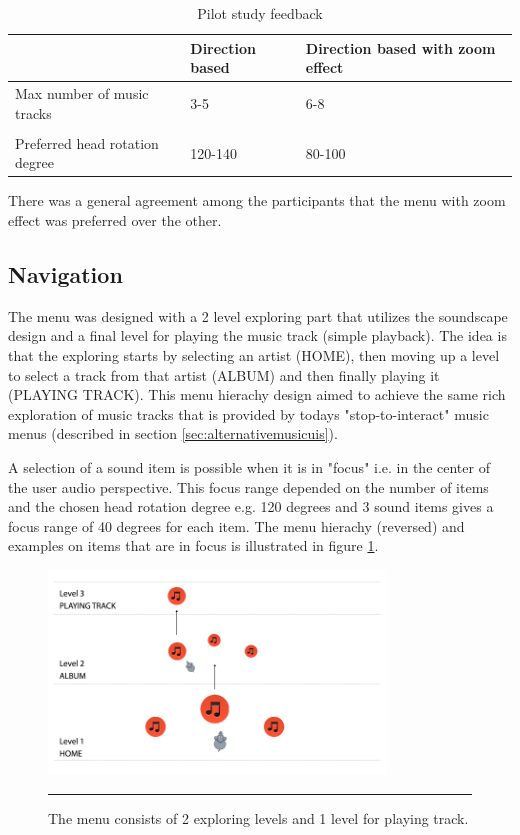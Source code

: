\begin{table}[t] 
\scriptsize
\centering
\caption{Pilot study feedback} %
\begin{tabular}{L{3cm}C{3cm}C{3cm}} \toprule
	 & Direction based & Direction based with zoom effect \\ \midrule
    Max number of music tracks   & 3-5 & 6-8 \\
    \\
    Preferred head rotation degree   & 120-140 & 80-100 \\ \bottomrule
\end{tabular}

\label{tab:pilotresults} 
\end{table}

There was a general agreement among the participants that the menu with zoom effect was preferred over the other.

\subsection{Navigation}
\label{sec:designnavigation}
The menu was designed with a 2 level exploring part that utilizes the soundscape design and a final level for playing the music track (simple playback). The idea is that the exploring starts by selecting an artist (HOME), then moving up a level to select a track from that artist (ALBUM) and then finally playing it (PLAYING TRACK). This menu hierachy design aimed to achieve the same rich exploration of music tracks that is provided by todays "stop-to-interact" music menus (described in section \ref{sec:alternativemusicuis}). 

A selection of a sound item is possible when it is in "focus" i.e. in the center of the user audio perspective. This focus range depended on the number of items and the chosen head rotation degree e.g. 120 degrees and 3 sound items gives a focus range of 40 degrees for each item. The menu hierachy (reversed) and examples on items that are in focus is illustrated in figure \ref{fig:navigation}.

\begin{figure}[b]
	\centering
		\includegraphics[width=0.8\textwidth,height=\textheight,keepaspectratio]{./Figures/navigation.png}
		\rule{35em}{0.5pt}
	\caption[Menu Hierachy]{The menu consists of 2 exploring levels and 1 level for playing track.}
	\label{fig:navigation}
\end{figure}


